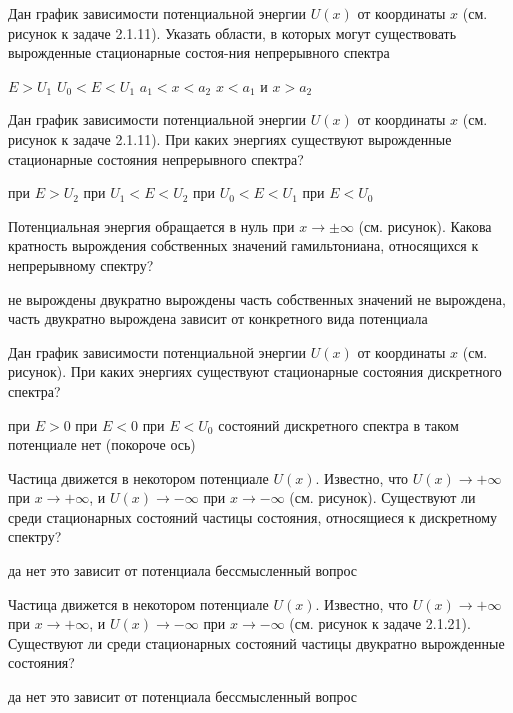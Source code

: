 \documentclass[11pt,a4paper]{exam}
\begin{document}
\begin{questions}
\question Дан график зависимости потенциальной энергии $U(x)$ от координаты $x$ (см. рисунок к задаче 2.1.11). Указать области, в которых могут существовать вырожденные стационарные состоя-ния непрерывного спектра
\begin{choices}
\choice $E > {U_1}$          
\choice ${U_0} < E < {U_1}$
\choice ${a_1} < x < {a_2}$           
\choice $x < {a_1}$ и $x > {a_2}$
\end{choices}

\question Дан график зависимости потенциальной энергии $U(x)$ от координаты $x$ (см. рисунок к задаче 2.1.11). При каких энергиях существуют вырожденные стационарные состояния непрерывного спектра?
\begin{choices}
\choice при $E > {U_2}$         
\choice при ${U_1} < E < {U_2}$
\choice при ${U_0} < E < {U_1}$       
\choice при $E < {U_0}$
\end{choices}

\question Потенциальная энергия обращается в нуль при $x \to  \pm \infty $ (см. рисунок). Какова кратность вырождения собственных значений гамильтониана, относящихся к непрерывному спектру?
\begin{choices}
\choice не вырождены
\choice двукратно вырождены
\choice часть собственных значений не вырождена, часть двукратно вырождена
\choice зависит от конкретного вида потенциала
\end{choices}

\question Дан график зависимости потенциальной энергии $U(x)$ от координаты $x$ (см. рисунок). При каких энергиях существуют стационарные состояния дискретного спектра?
\begin{choices}
\choice при $E > 0$       
\choice при $E < 0$
\choice при $E < {U_0}$         
\choice состояний дискретного спектра в таком потенциале нет (покороче ось)
\end{choices}

\question Частица движется в некотором потенциале $U(x)$. Известно, что $U(x) \to  + \infty $ при $x \to  + \infty $, и $U(x) \to  - \infty $ при $x \to  - \infty $ (см. рисунок). Существуют ли среди стационарных состояний частицы состояния, относящиеся к дискретному спектру?
\begin{choices}
\choice да                
\choice нет
\choice это зависит от потенциала     
\choice бессмысленный вопрос
\end{choices}

\question Частица движется в некотором потенциале $U(x)$. Известно, что $U(x) \to  + \infty $ при $x \to  + \infty $, и $U(x) \to  - \infty $ при $x \to  - \infty $ (см. рисунок к задаче 2.1.21). Существуют ли среди стационарных состояний частицы двукратно вырожденные состояния?
\begin{choices}
\choice да                
\choice нет
\choice это зависит от потенциала     
\choice бессмысленный вопрос
\end{choices}


\end{questions}
\end{document}
